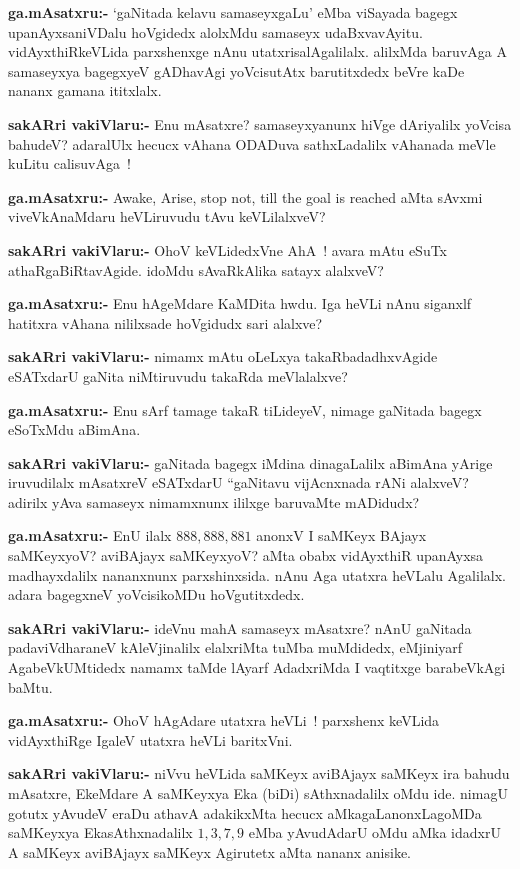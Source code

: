\smallskip
\noindent
\textbf{ga.mAsatxru:-} `gaNitada kelavu samaseyxgaLu' eMba viSayada bagegx upanAyxsaniVDalu hoVgidedx alolxMdu samaseyx udaBxvavAyitu. vidAyxthiRkeVLida parxshenxge nAnu utatxrisalAgalilalx. alilxMda baruvAga A samaseyxya bagegxyeV gADhavAgi yoVcisutAtx barutitxdedx beVre kaDe nananx gamana ititxlalx.

\smallskip
\noindent
\textbf{sakARri vakiVlaru:-} Enu mAsatxre? samaseyxyanunx hiVge dAriyalilx yoVcisa bahudeV? adaralUlx hecucx vAhana ODADuva sathxLadalilx vAhanada meVle kuLitu calisuvAga~!

\smallskip
\noindent
\textbf{ga.mAsatxru:-} {\rm Awake, Arise, stop not, till the goal is reached} aMta sAvxmi viveVkAnaMdaru heVLiruvudu tAvu keVLilalxveV?

\smallskip
\noindent
\textbf{sakARri vakiVlaru:-} OhoV keVLidedxVne AhA~! avara mAtu eSuTx athaRgaBiRtavAgide. idoMdu sAvaRkAlika satayx alalxveV?

\smallskip
\noindent
\textbf{ga.mAsatxru:-} Enu hAgeMdare KaMDita hwdu. Iga heVLi nAnu siganxlf hatitxra vAhana nililxsade hoVgidudx sari alalxve?

\smallskip
\noindent
\textbf{sakARri vakiVlaru:-} nimamx mAtu oLeLxya takaRbadadhxvAgide eSATxdarU gaNita niMtiruvudu takaRda meVlalalxve?

\smallskip
\noindent
\textbf{ga.mAsatxru:-} Enu sArf tamage takaR tiLideyeV, nimage gaNitada bagegx eSoTxMdu aBimAna.

\smallskip
\noindent
\textbf{sakARri vakiVlaru:-} gaNitada bagegx iMdina dinagaLalilx aBimAna yArige iruvudilalx mAsatxreV eSATxdarU ``gaNitavu vijAcnxnada rANi alalxveV? adirilx yAva samaseyx nimamxnunx ililxge baruvaMte mADidudx?

\smallskip
\noindent
\textbf{ga.mAsatxru:-} EnU ilalx $888, 888, 881$  anonxV I saMKeyx BAjayx saMKeyxyoV? aviBAjayx saMKeyxyoV? aMta obabx vidAyxthiR upanAyxsa madhayxdalilx nananxnunx parxshinxsida. nAnu Aga utatxra heVLalu Agalilalx. adara bagegxneV yoVcisikoMDu hoVgutitxdedx.

\smallskip
\noindent
\textbf{sakARri vakiVlaru:-} ideVnu mahA samaseyx mAsatxre? nAnU gaNitada padaviVdharaneV kAleVjinalilx elalxriMta tuMba muMdidedx, eMjiniyarf AgabeVkUMtidedx namamx taMde lAyarf AdadxriMda I vaqtitxge barabeVkAgi baMtu.

\smallskip
\noindent
\textbf{ga.mAsatxru:-} OhoV hAgAdare utatxra heVLi~! parxshenx keVLida vidAyxthiRge IgaleV utatxra heVLi baritxVni.

\smallskip
\noindent
\textbf{sakARri vakiVlaru:-} niVvu heVLida saMKeyx aviBAjayx saMKeyx ira bahudu mAsatxre, EkeMdare A saMKeyxya Eka (biDi) sAthxnadalilx oMdu ide. nimagU gotutx yAvudeV eraDu athavA adakikxMta hecucx aMkagaLanonxLagoMDa saMKeyxya EkasAthxnadalilx $1, 3, 7, 9$ eMba yAvudAdarU oMdu aMka idadxrU A saMKeyx aviBAjayx saMKeyx Agirutetx aMta nananx anisike.

